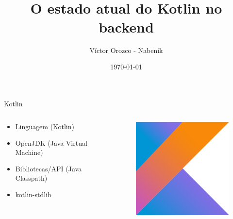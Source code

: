 \documentclass[aspectratio=169]{beamer}
\title{O estado atual do Kotlin no backend}
\author{Víctor Orozco - Nabenik}
\institute{@tuxtor}
\date{\today}
\begin{document}
{
    \frame{\titlepage}
}


\begin{frame}[fragile]{Kotlin}
    \begin{columns}
        \begin{column}{0.5\textwidth}
            \begin{itemize}
                \item Linguagem (Kotlin)
                \item OpenJDK (Java Virtual Machine)
                \item Bibliotecas/API (Java Classpath)
                \item kotlin-stdlib
            \end{itemize}
        \end{column}
        \begin{column}{0.5\textwidth}  %
            \begin{figure}
                \centering
                \includegraphics[width=0.4\linewidth]{Images/kotlin}
            \end{figure}
        \end{column}
    \end{columns}
\end{frame}
\end{document}
